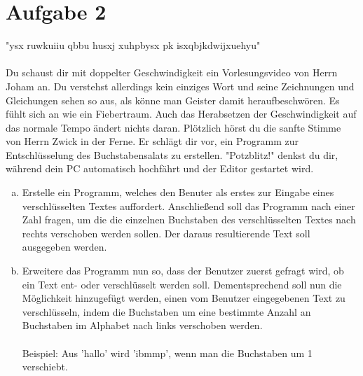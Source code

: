 \documentclass{standalone}
\begin{document}
\section{Aufgabe 2}
    "ysx ruwkuiiu qbbu husxj xuhpbysx pk isxqbjkdwijxuehyu"\\ \\
    Du schaust dir mit doppelter Geschwindigkeit ein Vorlesungsvideo von Herrn Joham an. Du verstehst allerdings kein 
    einziges Wort und seine Zeichnungen und Gleichungen sehen so aus, als könne man Geister damit heraufbeschwören. 
    Es fühlt sich an wie ein Fiebertraum. Auch das Herabsetzen der Geschwindigkeit auf das 
    normale Tempo ändert nichts daran. Plötzlich hörst du die sanfte Stimme von Herrn Zwick in der Ferne. Er schlägt dir vor, 
    ein Programm zur Entschlüsselung des Buchstabensalats zu erstellen. "Potzblitz!" denkst du dir, während dein PC automatisch hochfährt
    und der Editor gestartet wird.

\begin{enumerate}[a)]
\item
    Erstelle ein Programm, welches den Benuter als erstes zur Eingabe eines verschlüsselten Textes auffordert. 
    Anschließend soll das Programm nach einer Zahl fragen, um die die einzelnen Buchstaben des verschlüsselten Textes
    nach rechts verschoben werden sollen. Der daraus resultierende Text soll ausgegeben werden.

\item
    Erweitere das Programm nun so, dass der Benutzer zuerst gefragt wird, ob ein Text ent- oder verschlüsselt werden soll.
    Dementsprechend soll nun die Möglichkeit hinzugefügt werden, einen vom Benutzer eingegebenen Text zu verschlüsseln, indem 
    die Buchstaben um eine bestimmte Anzahl an Buchstaben im Alphabet nach links verschoben werden.\\ \\
    Beispiel: Aus 'hallo' wird 'ibmmp', wenn man die Buchstaben um 1 verschiebt.

\end{enumerate}
\end{document}
